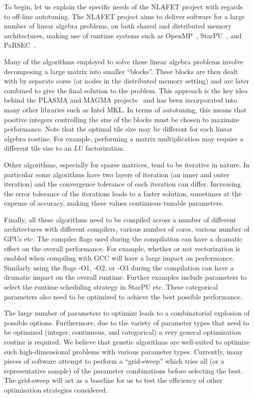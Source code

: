 \documentclass[a4paper,12pt]{article}
\begin{document}
To begin, let us explain the specific needs of the NLAFET project with
regards to off-line autotuning.  The NLAFET project aims to deliver
software for a large number of linear algebra problems, on both shared
and distributed memory architectures, making use of runtime systems
such as OpenMP~\cite{ayguade2009design},
StarPU~\cite{AugThiNamWac11CCPE}, and PaRSEC~\cite{bosilca2013parsec}.

Many of the algorithms employed to solve these linear algebra problems
involve decomposing a large matrix into smaller ``blocks''.  These
blocks are then dealt with by separate cores (or nodes in the
distributed memory setting) and are later combined to give the final
solution to the problem.  This approach is the key idea behind the
PLASMA and MAGMA projects~\cite{addh09} and has been incorporated into
many other libraries such as Intel MKL.  In terms of autotuning, this
means that positive integers controlling the size of the blocks must
be chosen to maximize performance.  Note that the optimal tile size
may be different for each linear algebra routine.  For example,
performing a matrix multiplication may require a different tile size
to an $LU$ factorization.

Other algorithms,
especially for sparse matrices,
tend to be iterative in nature.
In particular some algorithms have two layers of iteration
(an inner and outer iteration)
and the convergence tolerance of each iteration can differ.
Increasing the error tolerance of the iterations
leads to a faster solution,
sometimes at the expense of accuracy,
making these values continuous tunable parameters.

Finally,
all these algorithms need to be compiled across a number of different
architectures with
different compilers, various number of cores, various number of GPUs etc.
The compiler flags used during the compilation can have a dramatic
effect on the overall performance.
For example,
whether or not vectorization is enabled when compiling with GCC will
have a large impact on performance.
Similarly using the flags -O1, -O2, or -O3 during the compilation can have a
dramatic impact on the overall runtime.
Further examples include parameters to select the runtime scheduling
strategy in StarPU etc.
These categorical parameters also need to be optimized to
achieve the best possible performance.

The large number of parameters to optimize leads to a combinatorial
explosion of possible options.
Furthermore,
due to the variety of parameter types that need to be optimized
(integer, continuous, and categorical)
a very general optimization routine is required.
We believe that genetic algorithms are well-suited to optimize
such high-dimensional problems with various parameter types.
Currently,
many pieces of software attempt to perform a ``grid-sweep''
which tries all (or a representative sample)
of the parameter combinations before selecting the best.
The grid-sweep will act as a baseline for us to test the efficiency of
other optimisation strategies considered.
\end{document}
